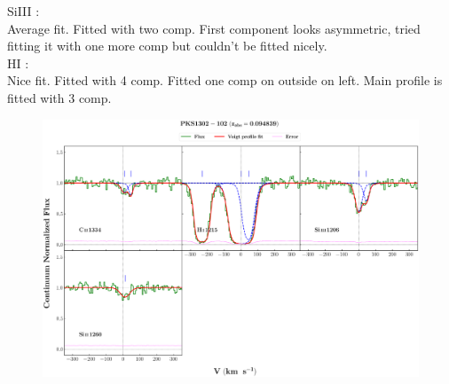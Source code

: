 \documentclass[12pt,draft]{report}
\begin{document}
SiIII :  \\  \hspace*{1.5cm}
        Average fit. Fitted with two comp.  First component looks asymmetric, tried fitting it with one more comp but couldn't be fitted nicely. \\

HI :  \\  \hspace*{1.5cm}
        Nice fit. Fitted with 4 comp. Fitted one comp on outside on left. Main profile is fitted with 3 comp.  \\



\newpage

\begin{landscape}

\begin{figure}
    \centering
    \vspace{-20mm}
    \hspace*{-35mm}
    \includegraphics[width=1.25\linewidth]{System-Plots/PKS1302-102_z=0.094839_sys_plot.png}
\end{figure}

\end{landscape}
\end{document}
